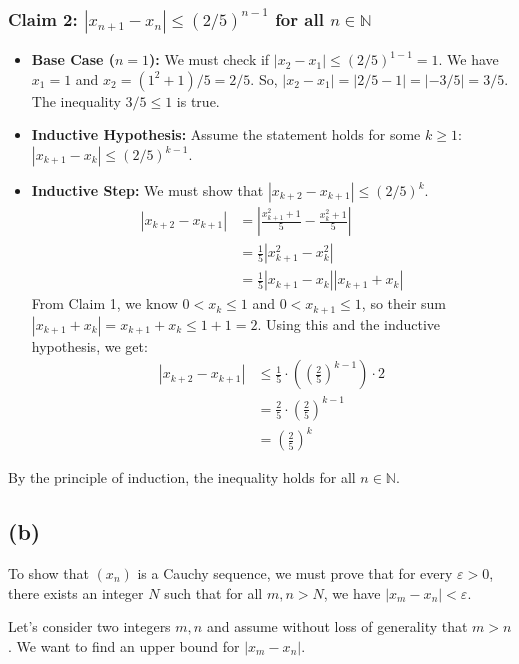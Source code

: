 \documentclass[12pt,a4paper]{article}
\theoremstyle{definition}
\theoremstyle{remark}
\begin{document}
\subsubsection*{Claim 2: $|x_{n+1} - x_n| \le (2/5)^{n-1}$ for all $n \in \mathbb{N}$}
\begin{itemize}
    \item \textbf{Base Case ($n=1$):}
    We must check if $|x_2 - x_1| \le (2/5)^{1-1} = 1$.
    We have $x_1 = 1$ and $x_2 = (1^2+1)/5 = 2/5$.
    So, $|x_2 - x_1| = |2/5 - 1| = |-3/5| = 3/5$.
    The inequality $3/5 \le 1$ is true.

    \item \textbf{Inductive Hypothesis:}
    Assume the statement holds for some $k \ge 1$: $|x_{k+1} - x_k| \le (2/5)^{k-1}$.

    \item \textbf{Inductive Step:}
    We must show that $|x_{k+2} - x_{k+1}| \le (2/5)^k$.
    \begin{align*}
        |x_{k+2} - x_{k+1}| &= \left| \frac{x_{k+1}^2 + 1}{5} - \frac{x_k^2 + 1}{5} \right| \\
        &= \frac{1}{5} |x_{k+1}^2 - x_k^2| \\
        &= \frac{1}{5} |x_{k+1} - x_k| |x_{k+1} + x_k|
    \end{align*}
    From Claim 1, we know $0 < x_k \le 1$ and $0 < x_{k+1} \le 1$, so their sum $|x_{k+1} + x_k| = x_{k+1} + x_k \le 1+1=2$.
    Using this and the inductive hypothesis, we get:
    \begin{align*}
        |x_{k+2} - x_{k+1}| &\le \frac{1}{5} \cdot \left( \left(\frac{2}{5}\right)^{k-1} \right) \cdot 2 \\
        &= \frac{2}{5} \cdot \left(\frac{2}{5}\right)^{k-1} \\
        &= \left(\frac{2}{5}\right)^k
    \end{align*}
\end{itemize}
By the principle of induction, the inequality holds for all $n \in \mathbb{N}$.



\subsection*{(b)}
To show that $(x_n)$ is a Cauchy sequence, we must prove that for every $\varepsilon > 0$, there exists an integer $N$ such that for all $m, n > N$, we have $|x_m - x_n| < \varepsilon$.

Let's consider two integers $m, n$ and assume without loss of generality that $m > n$. We want to find an upper bound for $|x_m - x_n|$.
\end{document}
